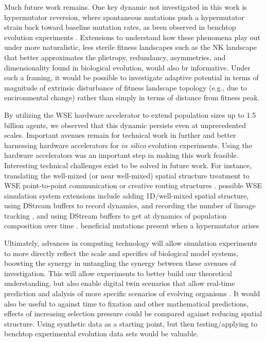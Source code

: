 Much future work remains.
One key dynamic not investigated in this work is hypermutator reversion, where spontaneous mutations push a hypermutator strain back toward baseline mutation rates, as been observed in benchtop evolution experiments \citep{ho2021evolutionary}.
Extensions to understand how these phenomena play out under more naturalistic, less sterile fitness landscapes such as the NK landscape that better approximates the plietropy, redundancy, asymmetries, and dimensionality found in biological evolution, would also br informative.
Under such a framing, it would be possible to investigate adaptive potential in terms of magnitude of extrinsic disturbance of fitness landscape topology (e.g., due to encironmental change) rather than simply in terms of distance from fitness peak.

By utilizing the WSE hardware accelerator to extend population sizes up to 1.5 billion agents, we observed that this dynamic persists even at unprecedented scales.
Important avenues remain for technical work in further and better harnessing hardware accelerators for \textit{in silico} evolution experiments.
Using the hardware accelerators was an important step in making this work feasible.
Interesting technical challenges exist to be solved in future work.
For instance, translating the well-mixed (or near well-mixed) spatial structure treatment to WSE point-to-point communication or creative routing structures \citep{james2020physical,luczynski2024near}.
possible WSE simulation system extensions include adding 1D/well-mixed spatial structure, using DStream buffers to record dynamics, and recording the number of lineage tracking \citep{moreno2024guide}, and using DStream buffers to get at dynamics of population composition over time \citep{moreno2024structured}.
beneficial mutations present when a hypermutator arises

Ultimately, advances in computing technology will allow simulation experiments to more directly reflect the scale and specifics of biological model systems, boowting the synergy in untangling the synergy between these avenues of investigation.
This will allow experiments to better build our theoretical understanding, but also enable digital twin scenarios that allow real-time prediction and alalysis of more specific scenarios of evolving organisms \citep{dekoning2023digital}.
It would also be useful to against time to fixation \citep{ribeck2016competition} and other mathematical predictions, effects of increasing selection pressure could be compared against reducing spatial structure.
Using synthetic data as a starting point, but then testing/applying to benchtop experimental evolution data sets would be valuable.
